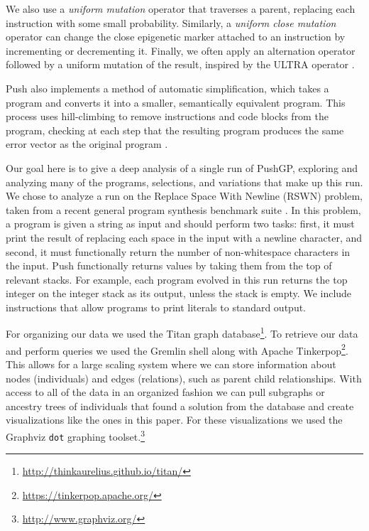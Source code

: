 
We also use a \textit{uniform mutation} operator that traverses a parent, 
replacing each instruction with some small probability. Similarly, a 
\textit{uniform close mutation} operator can change the close epigenetic marker 
attached to an instruction by incrementing or decrementing it. Finally, we 
often apply an alternation operator followed by a uniform mutation of the 
result, inspired by the ULTRA operator \citep{Spector:2013:GPTP}.

Push also implements a method of automatic simplification, which takes a program and 
converts it into a smaller, semantically equivalent program. This process uses 
hill-climbing to remove instructions and code blocks from the program, checking 
at each step that the resulting program produces the same error vector as the 
original program \citep{Spector:2014:GECCOcomp}.

Our goal here is to give a deep analysis of a single run of PushGP, exploring and analyzing many of the programs, selections, and variations that make up this run. We chose to analyze a run on the Replace Space With Newline (RSWN) problem, taken from a recent general program synthesis benchmark suite \citep{Helmuth:2015:GECCO}. In this problem, a program is given a string as input and should perform two tasks: first, it must print the result of replacing each space in the input with a newline character, and second, it must functionally return the number of non-whitespace characters in the input. Push functionally returns values by taking them from the top of relevant stacks. For example, each program evolved in this run returns the top integer on the integer stack as its output, unless the stack is empty. We include instructions that allow programs to print literals to standard output.

For organizing our data we used the Titan graph database\footnote{\url{http://thinkaurelius.github.io/titan/}}. To retrieve our data and perform queries we used the Gremlin shell along with Apache Tinkerpop\footnote{\url{https://tinkerpop.apache.org/}}. This allows for a large scaling system where
we can store information about nodes (individuals) and edges (relations), such as parent child relationships. With access to all of the data in an organized fashion we can pull subgraphs or ancestry trees of individuals that found a solution from the
database and create visualizations like the ones in this paper. For these visualizations we used the
Graphviz \texttt{dot} graphing toolset.\footnote{\url{http://www.graphviz.org/}}

